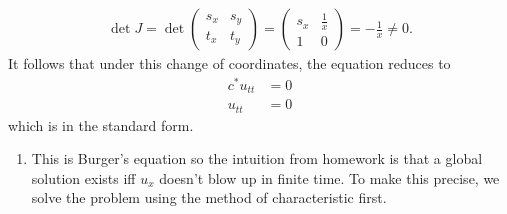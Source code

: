 \documentclass[12pt]{article}
\begin{document}
\begin{problem}[1]
	 \begin{align*}
		 \det J = \det  \begin{pmatrix} s_x&s_y\\t_x&t_y \end{pmatrix} = \begin{pmatrix} s_x & \frac{1}{x} \\ 1&0 \end{pmatrix} = -\frac{1}{x} \neq 0 .
	\end{align*}
	It follows that under this change of coordinates, the equation reduces to
	\begin{align*}
		c^* u_{tt} &= 0 \\
		u_{tt} &= 0 
	\end{align*}
	which is in the standard form.
\end{problem}
\begin{problem}[2]
\begin{enumerate}[label=(\alph*)]
\item 
This is Burger's equation so the intuition from homework is that a global solution exists iff $ u_x$ doesn't blow up in finite time. To make this precise, we solve the problem using the method of characteristic first.


\end{enumerate}
\end{problem}
\end{document}
